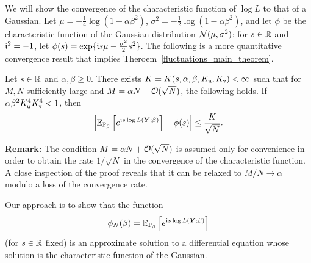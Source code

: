 \documentclass[final,12pt]{colt2018} %
\newcommand{\utt}{\textup{\texttt{u}}}
\newcommand{\vtt}{\textup{\texttt{v}}}
\newcommand{\Y}{\bm{Y}}
\begin{document}
We will show the convergence of  the characteristic function of $\log L$  to that of a Gaussian. 
Let $\mu = -\frac{1}{4}\log(1-\alpha \beta^2)$, $\sigma^2=-\frac{1}{2}\log(1-\alpha \beta^2)$,
and let $\phi$ be the characteristic function of the Gaussian distribution $\mathcal{N}(\mu,\sigma^2)$: for $s \in \mathbb{R}$ and $\mathfrak{i}^2 = -1$, let $\phi(s) = \exp\{\mathfrak{i} s \mu -\frac{\sigma^2}{2}s^2\}$.
The following is a more quantitative convergence result that implies Theroem~\ref{fluctuations_main_theorem}. 
\begin{theorem}\label{convergence_of_characteristic_function}
Let $s \in \mathbb{R}$ and $\alpha, \beta \ge 0$. There exists $K=K(s,\alpha,\beta,K_{\utt},K_{\vtt})<\infty$ such that for $M,N$ sufficiently large and $M = \alpha N + \mathcal{O}(\sqrt{N})$, the following holds. If $\alpha\beta^2K_{\utt}^4K_{\vtt}^4<1$, then
\[\abs{\E_{\P_{\beta}}\left[e^{\imnb s \log L(\Y;\beta)}\right] - \phi(s)} \le \frac{K}{\sqrt{N}}.\]
\end{theorem}
\textbf{Remark:} The condition $M = \alpha N + \mathcal{O}(\sqrt{N})$ is assumed only for convenience in order to obtain the rate $1/\sqrt{N}$ in the convergence of the characteristic function. A close inspection of the proof reveals that it can be relaxed to $M/N \to \alpha$ modulo a loss of the convergence rate.      

 Our approach is to show that the function 
 \[\phi_N(\beta) = \E_{\P_{\beta}}\left[e^{\imnb s \log L(\Y;\beta)}\right]\]
(for $s \in \mathbb{R}$ fixed) is an approximate solution to a differential equation whose solution is the characteristic function of the Gaussian. 
\end{document}
